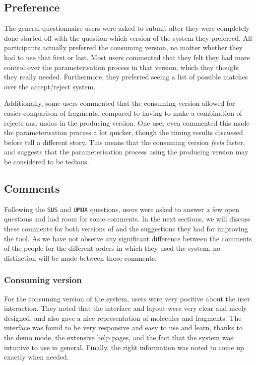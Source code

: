 \subsection{Preference}
The general questionnaire users were asked to submit after they were completely done started off with the question which version of the system they preferred. All participants actually preferred the consuming version, no matter whether they had to use that first or last. Most users commented that they felt they had more control over the parameterisation process in that version, which they thought they really needed. Furthermore, they preferred seeing a list of possible matches over the accept/reject system.

Additionally, some users commented that the consuming version allowed for easier comparison of fragments, compared to having to make a combination of rejects and undos in the producing version. One user even commented this made the parameterisation process a lot quicker, though the timing results discussed before tell a different story. This means that the consuming version \emph{feels} faster, and suggests that the parameterisation process using the producing version may be considered to be tedious.

\subsection{Comments}
Following the \verb|SUS| and \verb|UMUX| questions, users were asked to answer a few open questions and had room for some comments. In the next sections, we will discuss these comments for both versions of \oframp{} and the suggestions they had for improving the tool. As we have not observe any significant difference between the comments of the people for the different orders in which they used the system, no distinction will be made between those comments.

\subsubsection{Consuming version}
For the consuming version of the system, users were very positive about the user interaction. They noted that the interface and layout were very clear and nicely designed, and also gave a nice representation of molecules and fragments. The interface was found to be very responsive and easy to use and learn, thanks to the demo mode, the extensive help pages, and the fact that the system was intuitive to use in general. Finally, the right information was noted to come up exactly when needed.

